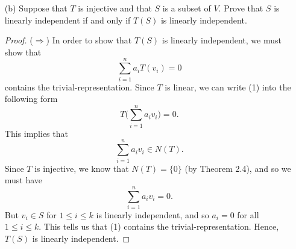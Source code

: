 \begin{enumerate}
\begin{proof}
            (\( \Leftarrow \)) Suppose \( T  \) carries linearly independent subsets of \( V  \) onto linearly independent subsets of \( W  \). Our goal is to show that \( T \) is injective. Suppose  
            \[  T \Big( \sum_{ i=1 }^{ n } a_{i} v_{i}  \Big) = T \Big( \sum_{ i=1 }^{ n } b_{i} v_{i} \Big) \tag{1} \]
            for some scalars \( a_{i}, b_{i}  \) and vectors \( v_{i} \in S  \) for all \( 1 \leq i \leq  k  \). Since \( T  \) is linear and \( T: S \to \mathcal{W}  \) is onto, we can re-write (1) into the following form:
            \[ \sum_{ i=1 }^{ k  } a_{i} T(v_{i}) = \sum_{ i=1 }^{ k  } b_{i} T(v_{i}) \tag{2}  \]
            which manipulating again, we get that
            \[  \sum_{ i=1 }^{ k  } (a_{i} - b_{i}) T(v_{i}) = 0. \tag{3}  \]
            Since \( T(v_{i}) \in W   \) and \( W  \) is linearly independent, we must have \( a_{i} - b_{i} = 0  \) if and only if \( a_{i} = b_{i} \). Hence, we have
            \[  \sum_{ i=1 }^{ n } a_{i} v_{i} = \sum_{ i=1 }^{ n  } b_{i} v_{i}   \]
            and so \( T  \) must be injective.
        \end{proof}
    \item[(b)] Suppose that \( T  \) is injective and that \( S  \) is a subset of \( V  \). Prove that \( S  \) is linearly independent if and only if \( T(S) \) is linearly independent.
        \begin{proof}
            (\( \Rightarrow \)) In order to show that \( T(S)  \) is linearly independent, we must show that 
            \[  \sum_{ i=1 }^{ n } a_{i} T(v_{i}) = 0   \tag{1} \] contains the trivial-representation. Since \( T  \) is linear, we can write (1) into the following form
            \[  T \Big( \sum_{ i=1 }^{ n } a_{i} v_{i} \Big) = 0. \] 
            This implies that
            \[  \sum_{ i=1 }^{ n } a_{i} v_{i} \in N(T). \]
            Since \( T  \) is injective, we know that \( N(T) = \{ 0  \}   \) (by Theorem 2.4), and so we must have
            \[  \sum_{ i=1 }^{ n } a_{i} v_{i} = 0. \tag{2} \]
            But \( v_{i} \in S  \) for \( 1 \leq i \leq k   \) is linearly independent, and so \( a_{i} = 0  \) for all \( 1 \leq i \leq k  \). This tells us that (1) contains the trivial-representation. Hence, \( T(S)  \) is linearly independent.


\end{proof}
\end{enumerate}
